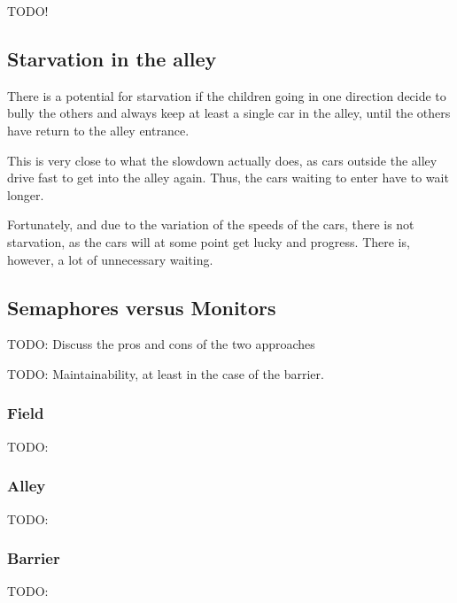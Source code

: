 
TODO!

\subsection{Starvation in the alley}
There is a potential for starvation if the children going in one direction decide to bully the others and always keep at least a single car in the alley, until the others have return to the alley entrance.

This is very close to what the slowdown actually does, as cars outside the alley drive fast to get into the alley again. Thus, the cars waiting to enter have to wait longer.

Fortunately, and due to the variation of the speeds of the cars, there is not starvation, as the cars will at some point get lucky and progress. There is, however, a lot of unnecessary waiting.

\subsection{Semaphores versus Monitors}
\label{sub:disc-sema-moni}

TODO: Discuss the pros and cons of the two approaches

TODO: Maintainability, at least in the case of the barrier.

\subsubsection{Field}
\label{subsub:disc-field}
TODO:

\subsubsection{Alley}
\label{subsub:disc-alley}
TODO:

\subsubsection{Barrier}
\label{subsub:disc-barrier}
TODO:
